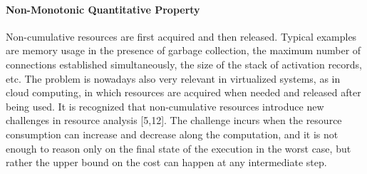 \paragraph*{Non-Monotonic Quantitative Property}

Non-cumulative resources are first acquired and then released.
Typical examples are memory usage in the presence of garbage collection, the maximum number of connections established simultaneously, the size of the stack of activation records, etc.
The problem is nowadays also very relevant in virtualized systems, as in cloud computing, 
in which resources are acquired when needed and released after being used.
It is recognized that non-cumulative resources introduce new challenges in resource analysis [5,12].
The challenge incurs when the resource consumption can increase and decrease along the computation, 
and it is not enough to reason only on the final state of the execution in the worst case,
but rather the upper bound on the cost can happen at any intermediate step.

